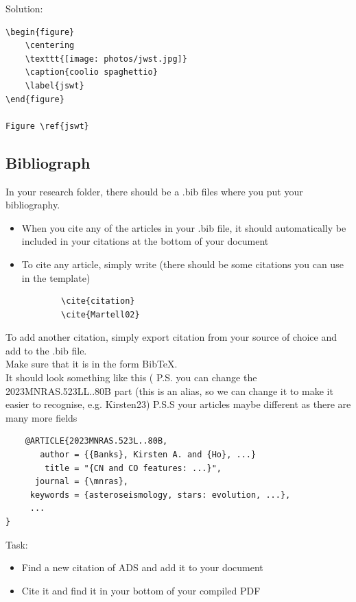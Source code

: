 \begin{frame}[fragile]
Solution:
\begin{verbatim}
\begin{figure}
    \centering
    \texttt{[image: photos/jwst.jpg]}
    \caption{coolio spaghettio}
    \label{jswt}
\end{figure}

Figure \ref{jswt}
\end{verbatim}

\end{frame}

\subsection{Bibliograph}

\begin{frame}[fragile]
In your research folder, there should be a .bib files where you put your bibliography.
\begin{itemize}
    \item When you cite any of the articles in your .bib file, it should automatically be included in your citations at the bottom of your document
    \item To cite any article, simply write (there should be some citations you can use in the template)
    \begin{verbatim}
        \cite{citation}
        \cite{Martell02}
    \end{verbatim}
\end{itemize}

\end{frame}


\begin{frame}[fragile]
To add another citation, simply export citation from your source of choice and add to the .bib file. \\
Make sure that it is in the form BibTeX. \\
It should look something like this (
P.S. you can change the 2023MNRAS.523LL..80B part (this is an alias, so we can change it to make it easier to recognise, e.g. Kirsten23)
P.S.S your articles maybe different as there are many more fields
\begin{verbatim}
    @ARTICLE{2023MNRAS.523L..80B,
       author = {{Banks}, Kirsten A. and {Ho}, ...}
        title = "{CN and CO features: ...}",
      journal = {\mnras},
     keywords = {asteroseismology, stars: evolution, ...},
     ...
}
\end{verbatim}
\end{frame}


\begin{frame}[fragile]
Task:
\begin{itemize}
    \item Find a new citation of ADS and add it to your document
    \item Cite it and find it in your bottom of your compiled PDF
\end{itemize}
\end{frame}


